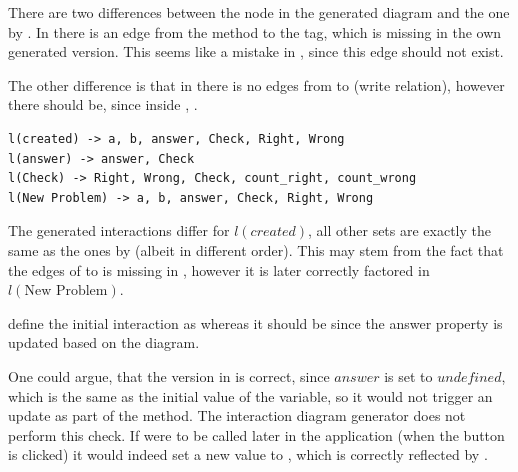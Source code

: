 There are two differences between the  node in the generated diagram and the one by \parencite{zhang2019scenario}.
In \textcite{zhang2019scenario} there is an edge from
the  method to the  tag, which is missing in the own generated version. This seems like a mistake in \parencite{zhang2019scenario}, since this edge should not exist.

The other difference is that in \parencite{zhang2019scenario} there is no edges from  to  (write relation), however there should be, since
inside , .

\begin{lstlisting}[language=JavaScriptPlain]
l(created) -> a, b, answer, Check, Right, Wrong
l(answer) -> answer, Check
l(Check) -> Right, Wrong, Check, count_right, count_wrong
l(New Problem) -> a, b, answer, Check, Right, Wrong
\end{lstlisting}

The generated interactions differ for $l(created)$, all other sets are exactly the same as the ones by \textcite{zhang2019scenario} (albeit in different order). This may stem from the fact that the edges of  to  is missing in \parencite{zhang2019scenario}, however it is later correctly factored in $l(\textrm{New Problem})$.

\textcite{zhang2019scenario} define the initial interaction as  
whereas it should be 
 since the answer property is updated based on the diagram. 

One could argue, that the version in \parencite{zhang2019scenario} is correct, since $answer$ is set to $undefined$, which is the same as the initial value of the variable, so it would not trigger an update as part of the  method. The interaction diagram generator does not perform this check. If  were to be called later in the application (when the  button is clicked) it would indeed set a new value to , which is correctly reflected by \textcite{zhang2019scenario}.



